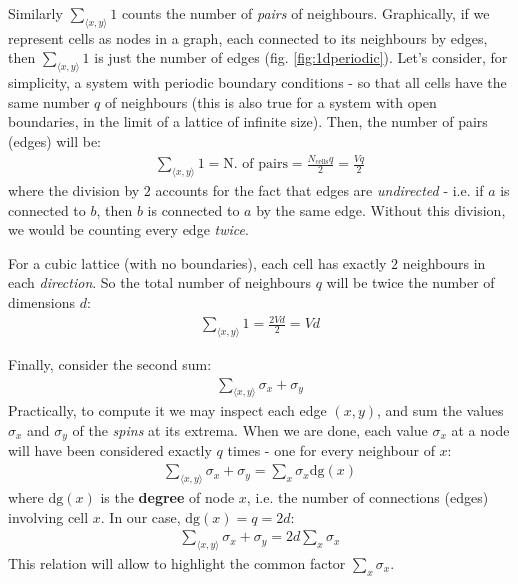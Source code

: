 \documentclass[../template.tex]{subfiles}
\begin{document}
\medskip

Similarly $\sum_{\langle x,y \rangle} 1$ counts the number of \textit{pairs} of neighbours. Graphically, if we represent cells as nodes in a graph, each connected to its neighbours by edges, then $\sum_{\langle x,y \rangle} 1$ is just the number of edges (fig. \ref{fig:1dperiodic}). Let's consider, for simplicity, a system with periodic boundary conditions - so that all cells have the same number $q$ of neighbours (this is also true for a system with open boundaries, in the limit of a lattice of infinite size). Then, the number of pairs (edges) will be:
\begin{align*}
    \sum_{\langle x,y \rangle} 1 = \text{N. of pairs} = \frac{N_{\mathrm{cells}} q}{2} = \frac{Vq}{2} 
\end{align*}
where the division by $2$ accounts for the fact that edges are \textit{undirected} - i.e. if $a$ is connected to $b$, then $b$ is connected to $a$ by the same edge. Without this division, we would be counting every edge \textit{twice}.  

\medskip

For a cubic lattice (with no boundaries), each cell has exactly $2$ neighbours in each \textit{direction}. So the total number of neighbours $q$ will be twice the number of dimensions $d$:
\begin{align}\label{eqn:sum2}
    \sum_{\langle x,y \rangle} 1 = \frac{2 V d}{2} = V d 
\end{align}

Finally, consider the second sum:
\begin{align*}
    \sum_{\langle x,y \rangle} \sigma_x + \sigma_y
\end{align*}
Practically, to compute it we may inspect each edge $(x,y)$, and sum the values $\sigma_x$ and $\sigma_y$ of the \textit{spins} at its extrema. When we are done, each value $\sigma_x$ at a node will have been considered exactly $q$ times - one for every neighbour of $x$:
\begin{align}\label{eqn:sum3}
    \sum_{\langle x,y \rangle} \sigma_x + \sigma_y = \sum_x \sigma_x \mathrm{dg}(x) 
\end{align}  
where $\mathrm{dg}(x)$ is the \textbf{degree} of node $x$, i.e. the number of connections (edges) involving cell $x$. In our case, $\mathrm{dg}(x) = q = 2d$:
\begin{align*}
    \sum_{\langle x,y \rangle} \sigma_x + \sigma_y = 2d \sum_x \sigma_x
\end{align*} 
This relation will allow to highlight the common factor $\sum_x \sigma_x$.
\end{document}
